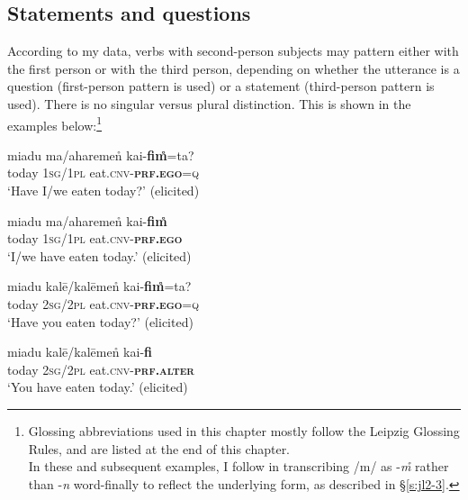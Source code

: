 \documentclass[output=paper]{langsci/langscibook}
\begin{document}
\subsection{Statements and questions}\label{s:jl3-1}

According to my data, verbs with second-person subjects may pattern either with the first person or with the third person, depending on whether the utterance is a question (first-person pattern is used) or a statement (third-person pattern is used). There is no singular versus plural distinction. This is shown in the examples below:\footnote{Glossing abbreviations used in this chapter mostly follow the Leipzig Glossing Rules, and are listed at the end of this chapter.\\ In these and subsequent examples, I follow \cite{Gnanadesikan2017} in transcribing /m/ as -\textit{m̊} rather than -\textit{n} word-finally to reflect the underlying form, as described in §‎\ref{s:jl2-3}.}


\begin{exe}
	\ex 	\label{ex:jl1}
	\gll miadu ma/aharemen̊ kai-\textbf{fim̊}=ta?\\
	today \textsc{1sg}/\textsc{1pl} eat.\textsc{cnv}-\textbf{\textsc{prf}.\textsc{ego}}=\textsc{q}\\
	\trans ‘Have I/we eaten today?’ (elicited)
\end{exe}

\begin{exe}
	\ex 	\label{ex:jl2}
	\gll miadu ma/aharemen̊ kai-\textbf{fim̊}\\
	today \textsc{1sg}/\textsc{1pl} eat.\textsc{cnv}-\textbf{\textsc{prf}.\textsc{ego}}\\
	\trans ‘I/we have eaten today.’ (elicited)
\end{exe}

\begin{exe}
	\ex 	\label{ex:jl3}
	\gll miadu kalē/kalēmen̊ kai-\textbf{fim̊}=ta?\\
	today \textsc{2sg}/\textsc{2pl} eat.\textsc{cnv}-\textbf{\textsc{prf}.\textsc{ego}}=\textsc{q}\\
	\trans ‘Have you eaten today?’ (elicited)
\end{exe}

\begin{exe}
	\ex 	\label{ex:jl4}
	\gll miadu kalē/kalēmen̊ kai-\textbf{fi}\\
	today \textsc{2sg}/\textsc{2pl} eat.\textsc{cnv}-\textbf{\textsc{prf}.\textsc{alter}}\\
	\trans ‘You have eaten today.’ (elicited)
\end{exe}
\end{document}
